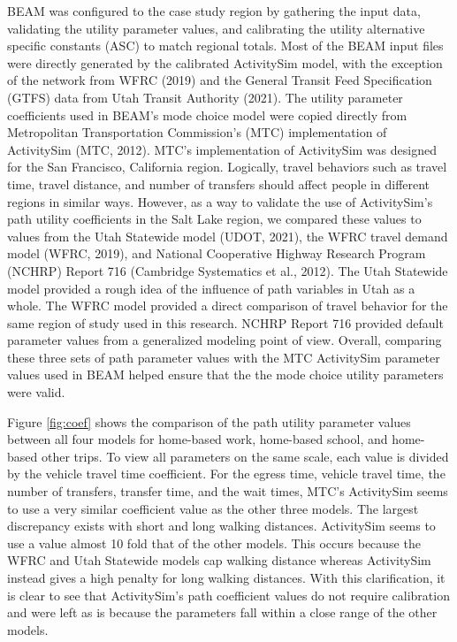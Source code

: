 \documentclass[fancy, masters]{byuthesis}
\begin{document}
BEAM was configured to the case study region by gathering the input data, validating the utility parameter values, and calibrating the utility alternative specific constants (ASC) to match regional totals. Most of the BEAM input files were directly generated by the calibrated ActivitySim model, with the exception of the network from WFRC (2019) and the General Transit Feed Specification (GTFS) data from Utah Transit Authority (2021). The utility parameter coefficients used in BEAM's mode choice model were copied directly from Metropolitan Transportation Commission's (MTC) implementation of ActivitySim (MTC, 2012). MTC's implementation of ActivitySim was designed for the San Francisco, California region. Logically, travel behaviors such as travel time, travel distance, and number of transfers should affect people in different regions in similar ways. However, as a way to validate the use of ActivitySim's path utility coefficients in the Salt Lake region, we compared these values to values from the Utah Statewide model (UDOT, 2021), the WFRC travel demand model (WFRC, 2019), and National Cooperative Highway Research Program (NCHRP) Report 716 (Cambridge Systematics et al., 2012). The Utah Statewide model provided a rough idea of the influence of path variables in Utah as a whole. The WFRC model provided a direct comparison of travel behavior for the same region of study used in this research. NCHRP Report 716 provided default parameter values from a generalized modeling point of view. Overall, comparing these three sets of path parameter values with the MTC ActivitySim parameter values used in BEAM helped ensure that the the mode choice utility parameters were valid.

Figure \ref{fig:coef} shows the comparison of the path utility parameter values between all four models for home-based work, home-based school, and home-based other trips. To view all parameters on the same scale, each value is divided by the vehicle travel time coefficient. For the egress time, vehicle travel time, the number of transfers, transfer time, and the wait times, MTC's ActivitySim seems to use a very similar coefficient value as the other three models. The largest discrepancy exists with short and long walking distances. ActivitySim seems to use a value almost 10 fold that of the other models. This occurs because the WFRC and Utah Statewide models cap walking distance whereas ActivitySim instead gives a high penalty for long walking distances. With this clarification, it is clear to see that ActivitySim's path coefficient values do not require calibration and were left as is because the parameters fall within a close range of the other models.
\end{document}
